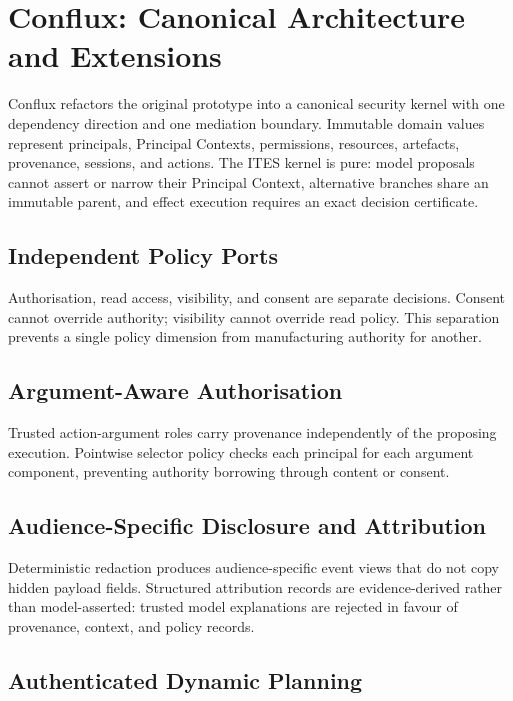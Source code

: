 \documentclass{article}
\begin{document}



\section{Conflux: Canonical Architecture and Extensions}

Conflux refactors the original prototype into a canonical security kernel
with one dependency direction and one mediation boundary. Immutable domain
values represent principals, Principal Contexts, permissions, resources,
artefacts, provenance, sessions, and actions. The ITES kernel is pure:
model proposals cannot assert or narrow their Principal Context,
alternative branches share an immutable parent, and effect execution
requires an exact decision certificate.

\subsection{Independent Policy Ports}

Authorisation, read access, visibility, and consent are separate decisions.
Consent cannot override authority; visibility cannot override read policy.
This separation prevents a single policy dimension from manufacturing
authority for another.

\subsection{Argument-Aware Authorisation}

Trusted action-argument roles carry provenance independently of the
proposing execution. Pointwise selector policy checks each principal for
each argument component, preventing authority borrowing through content or
consent.

\subsection{Audience-Specific Disclosure and Attribution}

Deterministic redaction produces audience-specific event views that do not
copy hidden payload fields. Structured attribution records are
evidence-derived rather than model-asserted: trusted model explanations are
rejected in favour of provenance, context, and policy records.

\subsection{Authenticated Dynamic Planning}
\end{document}
